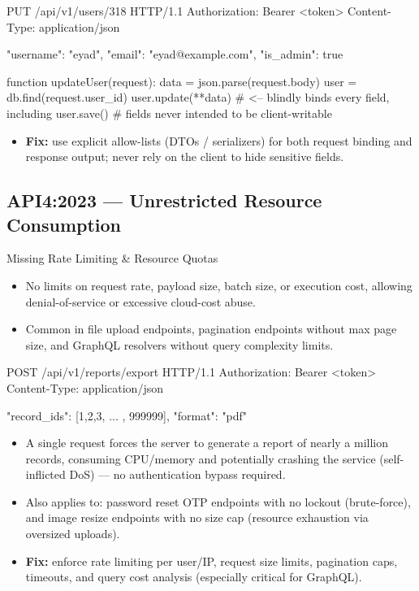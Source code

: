 \documentclass[11pt]{article}
\begin{document}
\begin{httpbox}
PUT /api/v1/users/318 HTTP/1.1
Authorization: Bearer <token>
Content-Type: application/json

{ "username": "eyad", "email": "eyad@example.com",
  "is_admin": true }
\end{httpbox}

\begin{pseudobox}
function updateUser(request):
    data = json.parse(request.body)
    user = db.find(request.user_id)
    user.update(**data)   # <-- blindly binds every field, including
    user.save()           #     fields never intended to be client-writable
\end{pseudobox}

\begin{itemize}
  \item \textbf{Fix:} use explicit allow-lists (DTOs / serializers) for both request binding and response output; never rely on the client to hide sensitive fields.
\end{itemize}

\subsection{API4:2023 --- Unrestricted Resource Consumption}
\begin{vulnbox}{Missing Rate Limiting \& Resource Quotas}
\begin{itemize}
  \item No limits on request rate, payload size, batch size, or execution cost, allowing denial-of-service or excessive cloud-cost abuse.
  \item Common in file upload endpoints, pagination endpoints without max page size, and GraphQL resolvers without query complexity limits.
\end{itemize}
\end{vulnbox}

\begin{httpbox}
POST /api/v1/reports/export HTTP/1.1
Authorization: Bearer <token>
Content-Type: application/json

{ "record_ids": [1,2,3, ... , 999999],
  "format": "pdf" }
\end{httpbox}

\begin{itemize}
  \item A single request forces the server to generate a report of nearly a million records, consuming CPU/memory and potentially crashing the service (self-inflicted DoS) --- no authentication bypass required.
  \item Also applies to: password reset OTP endpoints with no lockout (brute-force), and image resize endpoints with no size cap (resource exhaustion via oversized uploads).
  \item \textbf{Fix:} enforce rate limiting per user/IP, request size limits, pagination caps, timeouts, and query cost analysis (especially critical for GraphQL).
\end{itemize}
\end{document}
